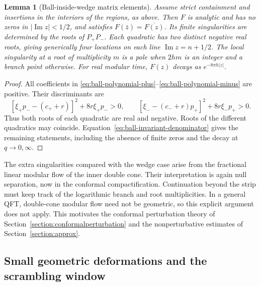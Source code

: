 \documentclass[a4paper,11pt]{article}
\newtheorem{lemma}[theorem]{Lemma}
\theoremstyle{definition}
\begin{document}
\begin{lemma}[Ball-inside-wedge matrix elements]
\label{lem:ball-matrix-element}
Assume strict containment and insertions in the interiors of the regions, as above. Then $F$ is analytic and has no zeros in $|\operatorname{Im}z|<1/2$, and satisfies $F(\bar z)=\overline{F(z)}$. Its finite singularities are determined by the roots of $P_+P_-$. Each quadratic has two distinct negative real roots, giving generically four locations on each line $\operatorname{Im}z=n+1/2$. The local singularity at a root of multiplicity $m$ is a pole when $2hm$ is an integer and a branch point otherwise. For real modular time, $F(z)$ decays as $e^{-8\pi h|z|}$.
\end{lemma}
\begin{proof}
All coefficients in \eqref{eq:ball-polynomial-plus}--\eqref{eq:ball-polynomial-minus} are positive. Their discriminants are
\[
 [\xi_+p_--(c_++r)]^2+8r\xi_+p_->0,\qquad [\xi_--(c_-+r)p_+]^2+8r\xi_-p_+>0.
\]
Thus both roots of each quadratic are real and negative. Roots of the different quadratics may coincide. Equation~\eqref{eq:ball-invariant-denominator} gives the remaining statements, including the absence of finite zeros and the decay at $q\to0,\infty$.
\end{proof}

The extra singularities compared with the wedge case arise from the fractional linear modular flow of the inner double cone. Their interpretation is again null separation, now in the conformal compactification. Continuation beyond the strip must keep track of the logarithmic branch and root multiplicities. In a general QFT, double-cone modular flow need not be geometric, so this explicit argument does not apply. This motivates the conformal perturbation theory of Section~\ref{section:conformalperturbation} and the nonperturbative estimates of Section~\ref{section:approx}.

\subsection{Small geometric deformations and the scrambling window}\label{subsec:small-deformations}
\end{document}
